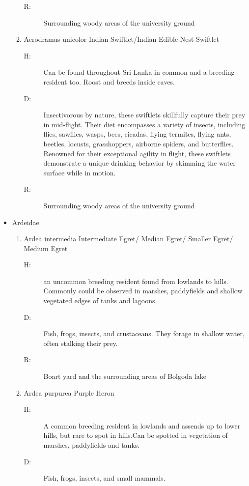 \begin{itemize}
\begin{enumerate}
\begin{description}
\item[R: ]%
Surrounding woody areas of the university ground%
\end{description}%
\item%
Aerodramus unicolor\newline%
Indian Swiftlet/Indian Edible{-}Nest Swiftlet%
\begin{description}%
\item[H: ]%
Can be found throughout Sri Lanka in common and a breeding resident too. Roost and breeds inside caves.%
\item[D: ]%
Insectivorous by nature, these swiftlets skillfully capture their prey in mid{-}flight. Their diet encompasses a variety of insects, including flies, sawflies, wasps, bees, cicadas, flying termites, flying ants, beetles, locusts, grasshoppers, airborne spiders, and butterflies. Renowned for their exceptional agility in flight, these swiftlets demonstrate a unique drinking behavior by skimming the water surface while in motion.%
\item[R: ]%
Surrounding woody areas of the university ground%
\end{description}%
\end{enumerate}%
\item%
Ardeidae%
\begin{enumerate}%
\item%
Ardea intermedia\newline%
Intermediate Egret/ Median Egret/ Smaller Egret/ Medium Egret%
\begin{description}%
\item[H: ]%
an uncommon breeding resident found from lowlands to hills. Commonly could be observed in marshes, paddyfields and shallow vegetated edges of tanks and lagoons.%
\item[D: ]%
Fish, frogs, insects, and crustaceans. They forage in shallow water, often stalking their prey.%
\item[R: ]%
Boart yard and the surrounding areas of Bolgoda lake%
\end{description}%
\item%
Ardea purpurea\newline%
Purple Heron%
\begin{description}%
\item[H: ]%
A common breeding resident in lowlands and assends up to lower hills, but rare to spot in hills.Can be spotted in vegetation of marshes, paddyfields and tanks. %
\item[D: ]%
Fish, frogs, insects, and small mammals.%

\end{description}
\end{enumerate}
\end{itemize}
